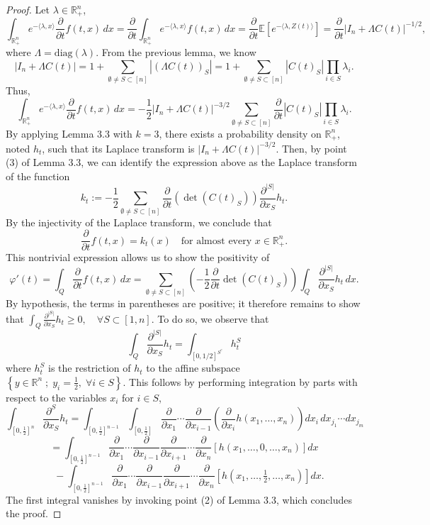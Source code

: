 \documentclass[12pt]{article}
\begin{document}
\begin{proof}
Let $\lambda \in \mathbb{R}^n_+$,
\[
\int_{\mathbb{R}^n_+} e^{-\langle \lambda, x \rangle} \frac{\partial}{\partial t} f(t, x) \, dx
= \frac{\partial}{\partial t} \int_{\mathbb{R}^n_+} e^{-\langle \lambda, x \rangle} f(t, x) \, dx
= \frac{\partial}{\partial t} \mathbb{E}[e^{-\langle \lambda, Z(t) \rangle}]
= \frac{\partial}{\partial t} \left| I_n + \Lambda C(t) \right|^{-1/2},
\]
where $\Lambda = \mathrm{diag}(\lambda)$. From the previous lemma, we know
\[
\left| I_n + \Lambda C(t) \right| = 1 + \sum_{\emptyset \neq S \subset [n]} \left| (\Lambda C(t))_S \right|
= 1 + \sum_{\emptyset \neq S \subset [n]} \left| C(t)_S \right| \prod_{i \in S} \lambda_i.
\]
Thus,
\[
\int_{\mathbb{R}^n_+} e^{-\langle \lambda, x \rangle} \frac{\partial}{\partial t} f(t, x) \, dx
= -\frac{1}{2} \left| I_n + \Lambda C(t) \right|^{-3/2} \sum_{\emptyset \neq S \subset [n]} \frac{\partial}{\partial t} \left| C(t)_S \right| \prod_{i \in S} \lambda_i.
\]
By applying Lemma 3.3 with $k = 3$, there exists a probability density on $\mathbb{R}^n_+$,
noted $h_t$, such that its Laplace transform is $\lvert I_n + \Lambda C(t) \rvert^{-3/2}$.
Then, by point (3) of Lemma 3.3, we can identify the expression above as the Laplace transform of the function
\[
k_t := -\frac{1}{2} \sum_{\emptyset \neq S \subset [n]} \frac{\partial}{\partial t} \left( \det(C(t)_S) \right) \frac{\partial^{|S|}}{\partial x_S} h_t.
\]
By the injectivity of the Laplace transform, we conclude that
\[
\frac{\partial}{\partial t} f(t,x) = k_t(x)
\quad \text{for almost every } x \in \mathbb{R}^n_+.
\]
This nontrivial expression allows us to show the positivity of
\[
\varphi'(t) = \int_Q \frac{\partial}{\partial t} f(t,x) \, dx
= \sum_{\emptyset \neq S \subset [n]} \left( -\frac{1}{2} \frac{\partial}{\partial t} \det(C(t)_S) \right) \int_Q \frac{\partial^{|S|}}{\partial x_S} h_t \, dx.
\]
By hypothesis, the terms in parentheses are positive; it therefore remains to show that $\int_Q \frac{\partial^{|S|}}{\partial x_S} h_t \geq 0, \quad \forall S \subset [1,n].$
To do so, we observe that
\[
\int_Q \frac{\partial^{|S|}}{\partial x_S} h_t = \int_{[0,1/2]^{S^c}} h_t^S
\]
where $h_t^S$ is the restriction of $h_t$ to the affine subspace
$\left\{ y \in \mathbb{R}^n \; ; \; y_i = \frac{1}{2}, \; \forall i \in S \right\}.$
This follows by performing integration by parts with respect to the variables $x_i$ for $i \in S$,
\[
\int_{[0,\frac{1}{2}]^n} \frac{\partial^S}{\partial x_S} h_t
= \int_{[0,\frac{1}{2}]^{n-1}} \int_{[0,\frac{1}{2}]}
\frac{\partial}{\partial x_1} \cdots \frac{\partial}{\partial x_{i-1}}
\left( \frac{\partial}{\partial x_i} h(x_1, \ldots, x_n) \right) dx_i \, dx_{j_1} \cdots dx_{j_m}
\]
\[
= \int_{[0,\frac{1}{2}]^{n-1}}
\frac{\partial}{\partial x_1} \cdots \frac{\partial}{\partial x_{i-1}} \frac{\partial}{\partial x_{i+1}} \cdots \frac{\partial}{\partial x_n}
\left[ h(x_1, \ldots, 0, \ldots, x_n) \right] dx
\]
\[
\quad - \int_{[0,\frac{1}{2}]^{n-1}}
\frac{\partial}{\partial x_1} \cdots \frac{\partial}{\partial x_{i-1}} \frac{\partial}{\partial x_{i+1}} \cdots \frac{\partial}{\partial x_n}
\left[ h(x_1, \ldots, \tfrac{1}{2}, \ldots, x_n) \right] dx.
\]
The first integral vanishes by invoking point (2) of Lemma 3.3, which concludes the proof.
\end{proof}
\end{document}
